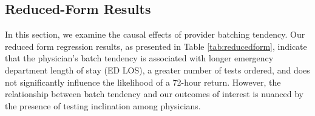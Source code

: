 \documentclass[,,nonblindrev]{informs}
\begin{document}
\hypertarget{reduced-form-results}{%
\subsection{Reduced-Form Results}\label{reduced-form-results}}

In this section, we examine the causal effects of provider batching
tendency. Our reduced form regression results, as presented in Table
\ref{tab:reducedform}, indicate that the physician's batch tendency is
associated with longer emergency department length of stay (ED LOS), a
greater number of tests ordered, and does not significantly influence
the likelihood of a 72-hour return. However, the relationship between
batch tendency and our outcomes of interest is nuanced by the presence
of testing inclination among physicians.
\end{document}
